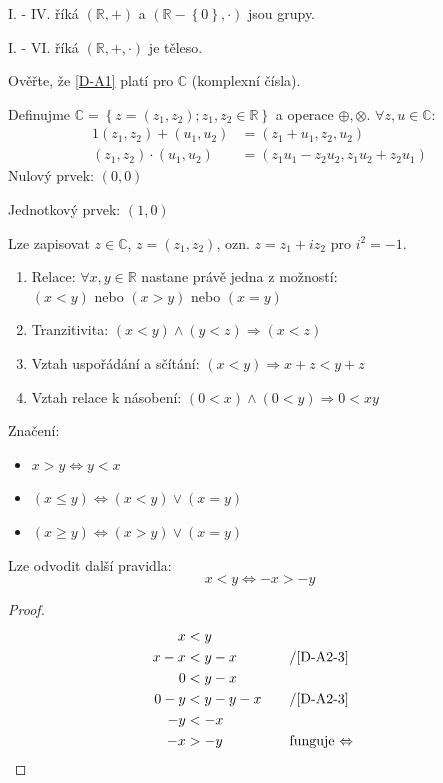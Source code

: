 I. - IV. říká $(\mathbb{R}, +)$ a $(\mathbb{R} - \left\{0\right\}, \cdot)$ jsou grupy.

I. - VI. říká $(\mathbb{R}, +, \cdot)$ je těleso.

Ověřte, že \autoref{D-A1} platí pro $\mathbb{C}$ (komplexní čísla).

\begin{example}
	Definujme $\mathbb{C} = \left\{z = (z_1, z_2); z_1, z_2 \in \mathbb{R}\right\}$ a
		operace $\oplus, \otimes$. $\forall z, u \in \mathbb{C}:$
	\begin{alignat}{1}
		(z_1, z_2) + (u_1, u_2) &= (z_1 + u_1, z_2, u_2) \\
		(z_1, z_2) \cdot (u_1, u_2) &= (z_1u_1 - z_2u_2, z_1u_2 + z_2u_1)
	\end{alignat}
	Nulový prvek: $(0, 0)$
	
	Jednotkový prvek: $(1, 0)$

	Lze zapisovat $z\in \mathbb{C}$, $z = (z_1, z_2)$, ozn. $z = z_1 + iz_2$ pro $i^2 = -1$.
\end{example}
\begin{definitionAi}[name=Uspořádání, label=D-A2]\noindent
	\begin{enumerate}[I]
		\item Relace: $\forall x, y \in \mathbb{R}$ nastane právě jedna z možností: \\
		$(x<y)$ nebo $(x>y)$ nebo $(x=y)$
		\item Tranzitivita: $(x<y) \land (y<z) \Rightarrow (x<z)$
		\item\label{D-A2-3} Vztah uspořádání a sčítání: $(x<y) \Rightarrow x+z < y+z$
		\item\label{D-A2-4} Vztah relace k násobení: $(0<x) \land (0<y) \Rightarrow 0 < xy$
	\end{enumerate}
\end{definitionAi}

Značení:
\begin{itemize}
	\item $x>y \Leftrightarrow y<x$
	\item $(x\leq y) \Leftrightarrow (x<y) \lor (x=y)$
	\item $(x\geq y) \Leftrightarrow (x>y) \lor (x=y)$
\end{itemize}

Lze odvodit další pravidla:
\begin{equation}\label{RelationsOfNegatives}
	x<y \Leftrightarrow -x > -y
\end{equation}
\begin{proof}
	\begin{alignat*}{2}
		x&<y \\
		x-x&<y-x &&\text{\quad /\autoref{D-A2-3}} \\
		0&<y-x \\
		0-y&<y-y-x &&\text{\quad /\autoref{D-A2-3}} \\
		-y&<-x \\
		-x&>-y &&\text{\quad funguje $\Leftrightarrow$}
	\end{alignat*}
\end{proof}

